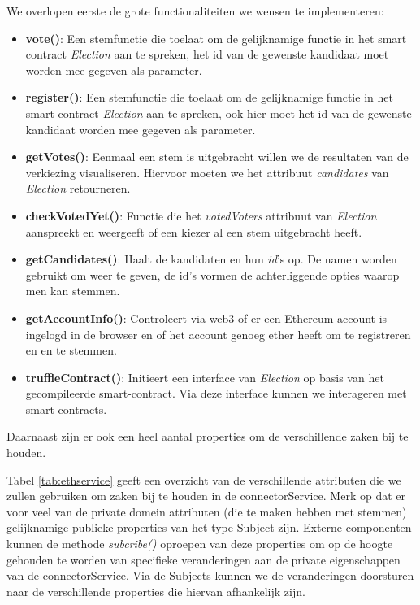 	We overlopen eerste de grote functionaliteiten we wensen te implementeren:
	\begin{itemize}
		\item \textbf{vote()}: Een stemfunctie die toelaat om  de gelijknamige functie in het smart contract \textit{Election} aan te spreken, het id van de gewenste kandidaat moet worden mee gegeven als parameter.
		\item \textbf{register()}: Een stemfunctie die toelaat om  de gelijknamige functie in het smart contract \textit{Election} aan te spreken, ook hier moet het id van de gewenste kandidaat worden mee gegeven als parameter.
		\item \textbf{getVotes()}: Eenmaal een stem is uitgebracht willen we de resultaten van de verkiezing visualiseren. Hiervoor moeten we het attribuut \textit{candidates} van \textit{Election} retourneren.
		\item \textbf{checkVotedYet()}: Functie die het \textit{votedVoters} attribuut van \textit{Election} aanspreekt en weergeeft of een kiezer al een stem uitgebracht heeft.
		\item \textbf{getCandidates()}: Haalt de kandidaten en hun \textit{id}'s op. De namen worden gebruikt om weer te geven, de id's vormen de achterliggende opties waarop men kan stemmen.
		\item \textbf{getAccountInfo()}: Controleert via web3 of er een Ethereum account is ingelogd in de browser en of het account genoeg ether heeft om te registreren en en te stemmen.
		\item \textbf{truffleContract()}: Initieert een interface van \textit{Election} op basis van het gecompileerde smart-contract. Via deze interface kunnen we  interageren met smart-contracts.
	\end{itemize}

Daarnaast zijn er ook een heel aantal properties om de verschillende zaken bij te houden. 

Tabel \ref{tab:ethservice} geeft een overzicht van de verschillende attributen die we zullen gebruiken om zaken bij te houden in de connectorService. 
Merk op dat er voor veel van de private domein attributen (die te maken hebben met stemmen) gelijknamige publieke properties van het type Subject zijn. Externe componenten kunnen de methode \textit{subcribe()} oproepen van deze properties om op de hoogte gehouden te worden van specifieke veranderingen aan de private eigenschappen van de connectorService. Via de Subjects kunnen we de veranderingen doorsturen naar de verschillende properties die hiervan afhankelijk zijn.

